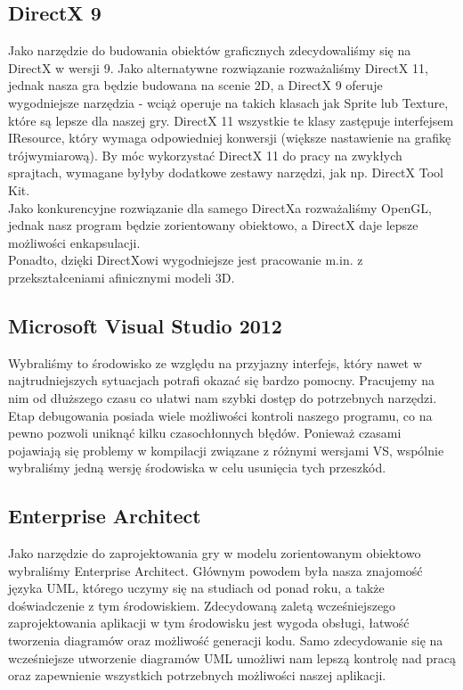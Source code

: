 \documentclass[a4paper,twoside]{article}
\begin{document}
	\subsection{DirectX 9}
	Jako narzędzie do budowania obiektów graficznych zdecydowaliśmy się na DirectX w wersji 9. Jako alternatywne rozwiązanie rozważaliśmy DirectX 11, jednak nasza gra będzie budowana na scenie 2D, a DirectX 9 oferuje wygodniejsze narzędzia - wciąż operuje na takich klasach jak Sprite lub Texture, które są lepsze dla naszej gry. DirectX 11 wszystkie te klasy zastępuje interfejsem IResource, który wymaga odpowiedniej konwersji (większe nastawienie na grafikę trójwymiarową). By móc wykorzystać DirectX 11 do pracy na zwykłych sprajtach, wymagane byłyby dodatkowe zestawy narzędzi, jak np. DirectX Tool Kit.\\
	Jako konkurencyjne rozwiązanie dla samego DirectXa rozważaliśmy OpenGL, jednak nasz program będzie zorientowany obiektowo, a DirectX daje lepsze możliwości enkapsulacji.\\
	Ponadto, dzięki DirectXowi wygodniejsze jest pracowanie m.in. z przekształceniami afinicznymi modeli 3D.
	
	\subsection{Microsoft Visual Studio 2012}
	Wybraliśmy to środowisko ze względu na przyjazny interfejs, który nawet w najtrudniejszych sytuacjach potrafi okazać się bardzo pomocny. Pracujemy na nim od dłuższego czasu co ułatwi nam szybki dostęp do potrzebnych narzędzi. Etap debugowania posiada wiele możliwości kontroli naszego programu, co na pewno pozwoli uniknąć kilku czasochłonnych błędów. Ponieważ czasami pojawiają się problemy w kompilacji związane z różnymi wersjami VS, wspólnie wybraliśmy jedną wersję środowiska w celu usunięcia tych przeszkód.
	
	\newpage
	\subsection{Enterprise Architect}
	Jako narzędzie do zaprojektowania gry w modelu zorientowanym obiektowo wybraliśmy Enterprise Architect. Głównym powodem była nasza znajomość języka UML, którego uczymy się na studiach od ponad roku, a także doświadczenie z tym środowiskiem. Zdecydowaną zaletą wcześniejszego zaprojektowania aplikacji w tym środowisku jest wygoda obsługi, łatwość tworzenia diagramów oraz możliwość generacji kodu. Samo zdecydowanie się na wcześniejsze utworzenie diagramów UML umożliwi nam lepszą kontrolę nad pracą oraz zapewnienie wszystkich potrzebnych możliwości naszej aplikacji.
	
\end{document}
